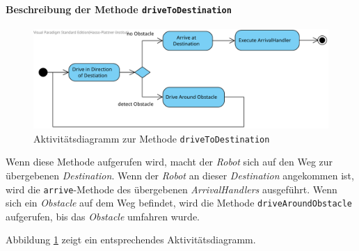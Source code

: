 			\paragraph{Beschreibung der Methode \texttt{driveToDestination}}
			\begin{figure}[H]
			\centering
			\includegraphics[width=1\textwidth]{img/1-Entwurf-7-1-methode_driveAroundObstacle}
			\caption{Aktivitätsdiagramm zur Methode \texttt{driveToDestination}}
			\label{AktivitaetDriveToDestination}
			\end{figure}

			Wenn diese Methode aufgerufen wird, macht der \textit{Robot} sich auf den Weg zur 
			übergebenen \textit{Destination}. Wenn der \textit{Robot} an dieser \textit{Destination} 
			angekommen ist, wird die \texttt{arrive}-Methode des übergebenen \textit{ArrivalHandlers} ausgeführt. 
			Wenn sich ein \textit{Obstacle} auf dem Weg befindet, wird die Methode \texttt{driveAroundObstacle} 
			aufgerufen, bis das \textit{Obstacle} umfahren wurde.
			
			Abbildung \ref{AktivitaetDriveToDestination} zeigt ein entsprechendes Aktivitätsdiagramm.

